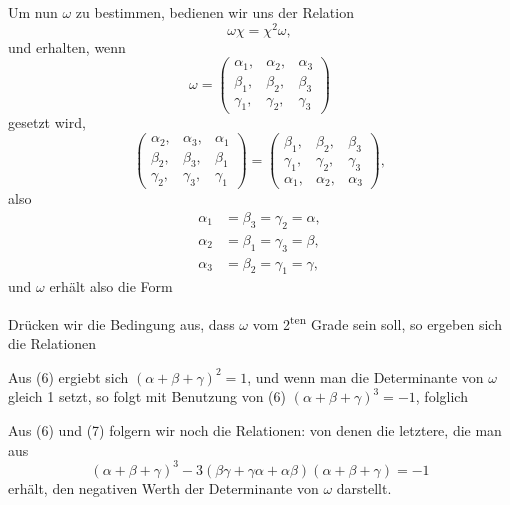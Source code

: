 Um nun $\omega$ zu bestimmen, bedienen wir uns der Relation
\[
\omega \chi = \chi^2 \omega,
\]
und erhalten, wenn
\[
\omega = \begin{pmatrix} \alpha_1, & \alpha_2, & \alpha_3 \\ \beta_1, & \beta_2, & \beta_3 \\ \gamma_1, & \gamma_2, & \gamma_3 \end{pmatrix}
\]
gesetzt wird,
\[
\begin{pmatrix} \alpha_2, & \alpha_3, & \alpha_1 \\ \beta_2, & \beta_3, & \beta_1 \\ \gamma_2, & \gamma_3, & \gamma_1 \end{pmatrix}
=
\begin{pmatrix} \beta_1, & \beta_2, & \beta_3 \\ \gamma_1, & \gamma_2, & \gamma_3 \\ \alpha_1, & \alpha_2, & \alpha_3 \end{pmatrix},
\]
also
\[
\begin{aligned}
\alpha_1 &= \beta_3 = \gamma_2 = \alpha, \\
\alpha_2 &= \beta_1 = \gamma_3 = \beta, \\
\alpha_3 &= \beta_2 = \gamma_1 = \gamma,
\end{aligned}
\]
und $\omega$ erhält also die Form

Drücken wir die Bedingung aus, dass $\omega$ vom 2\textsuperscript{ten} Grade
sein soll, so ergeben sich die Relationen

Aus (6) ergiebt sich $(\alpha + \beta + \gamma)^2 = 1$, und wenn man die
Determinante von $\omega$ gleich 1 setzt, so folgt mit Benutzung von (6)
$(\alpha + \beta + \gamma)^3 = -1$, folglich

Aus (6) und (7) folgern wir noch die Relationen:
von denen die letztere, die man aus
\[
(\alpha + \beta + \gamma)^3 - 3(\beta\gamma + \gamma\alpha + \alpha\beta)(\alpha + \beta + \gamma) = -1
\]
erhält, den negativen Werth der Determinante von $\omega$ darstellt.

